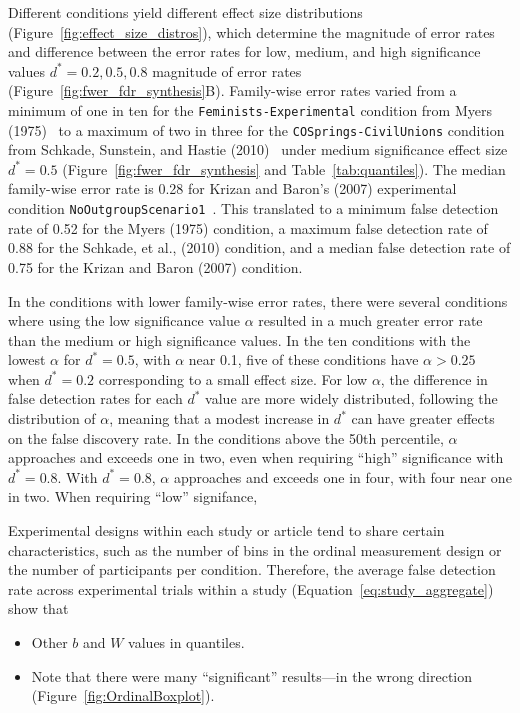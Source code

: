 \documentclass[preview]{article}
\begin{document}
Different conditions yield different effect size distributions
(Figure~\ref{fig:effect_size_distros}), which 
determine the magnitude of error rates and difference between the error rates for low,
medium, and high significance values $d^*=0.2,0.5,0.8$ magnitude of error rates 
(Figure~\ref{fig:fwer_fdr_synthesis}B). 
Family-wise error rates varied from a minimum of one in ten for the
\texttt{Feminists-Experimental} condition from Myers (1975)~\cite{Myers1975a}
to a maximum of two in three for the \texttt{COSprings-CivilUnions} condition from
Schkade, Sunstein, and Hastie (2010)~\cite{Schkade2010} under medium
significance effect size $d^* = 0.5$ (Figure~\ref{fig:fwer_fdr_synthesis} and
Table~\ref{tab:quantiles}). The median family-wise error
rate is 0.28 for Krizan and Baron's (2007) experimental condition
\texttt{NoOutgroupScenario1}~\cite{Krizan2007}. This translated to a minimum
false detection rate of 0.52 for the Myers (1975) condition, a maximum false
detection rate of 0.88 for the Schkade, et al., (2010) condition, and a median false
detection rate of 0.75 for the Krizan and Baron (2007) condition. 


In the conditions
with lower family-wise error rates, there were several conditions where using the low 
significance value $\alpha$ resulted in a much greater error rate than the medium or 
high significance values. In the ten conditions with the lowest $\alpha$ for 
$d^* = 0.5$, with $\alpha$ near 0.1, five of these conditions have $\alpha > 0.25$
when $d^* = 0.2$ corresponding to a small effect size. For low $\alpha$, the
difference in false detection rates for each $d^*$ value are more widely
distributed, following the distribution of $\alpha$, meaning that 
a modest increase in $d^*$ can have greater effects on the false discovery rate. In
the conditions above the 50th percentile, $\alpha$ approaches and exceeds one in
two, even when requiring ``high'' significance with $d^*=0.8$. With $d^* = 0.8$,
$\alpha$ approaches and exceeds one in four, with four near one in two. When 
requiring ``low'' signifance, 

Experimental designs within each study or article tend to share certain
characteristics, such as the number of bins in the ordinal measurement design
or the number of participants per condition. Therefore, the 
average false detection rate across experimental trials within a study
(Equation~\ref{eq:study_aggregate}) show that 


\begin{itemize}
  \item 
    Other $b$ and $W$ values in quantiles.
  \item
    Note that there were many ``significant'' results---in the wrong direction
    (Figure~\ref{fig:OrdinalBoxplot}).
\end{itemize}
\end{document}
